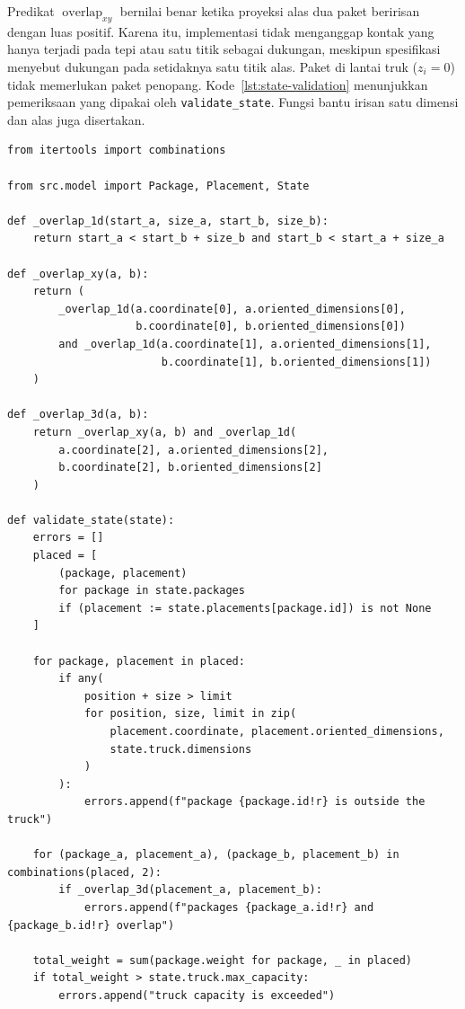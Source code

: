 Predikat $\operatorname{overlap}_{xy}$ bernilai benar ketika proyeksi alas dua paket beririsan dengan luas positif. Karena itu, implementasi tidak menganggap kontak yang hanya terjadi pada tepi atau satu titik sebagai dukungan, meskipun spesifikasi menyebut dukungan pada setidaknya satu titik alas. Paket di lantai truk ($z_i=0$) tidak memerlukan paket penopang. Kode~\ref{lst:state-validation} menunjukkan pemeriksaan yang dipakai oleh \texttt{validate\_state}. Fungsi bantu irisan satu dimensi dan alas juga disertakan.

\begin{lstlisting}[caption={Validasi batas ruang, tabrakan, kapasitas, dan dukungan},label={lst:state-validation}]
from itertools import combinations

from src.model import Package, Placement, State

def _overlap_1d(start_a, size_a, start_b, size_b):
    return start_a < start_b + size_b and start_b < start_a + size_a

def _overlap_xy(a, b):
    return (
        _overlap_1d(a.coordinate[0], a.oriented_dimensions[0],
                    b.coordinate[0], b.oriented_dimensions[0])
        and _overlap_1d(a.coordinate[1], a.oriented_dimensions[1],
                        b.coordinate[1], b.oriented_dimensions[1])
    )

def _overlap_3d(a, b):
    return _overlap_xy(a, b) and _overlap_1d(
        a.coordinate[2], a.oriented_dimensions[2],
        b.coordinate[2], b.oriented_dimensions[2]
    )

def validate_state(state):
    errors = []
    placed = [
        (package, placement)
        for package in state.packages
        if (placement := state.placements[package.id]) is not None
    ]

    for package, placement in placed:
        if any(
            position + size > limit
            for position, size, limit in zip(
                placement.coordinate, placement.oriented_dimensions,
                state.truck.dimensions
            )
        ):
            errors.append(f"package {package.id!r} is outside the truck")

    for (package_a, placement_a), (package_b, placement_b) in combinations(placed, 2):
        if _overlap_3d(placement_a, placement_b):
            errors.append(f"packages {package_a.id!r} and {package_b.id!r} overlap")

    total_weight = sum(package.weight for package, _ in placed)
    if total_weight > state.truck.max_capacity:
        errors.append("truck capacity is exceeded")


\end{lstlisting}
